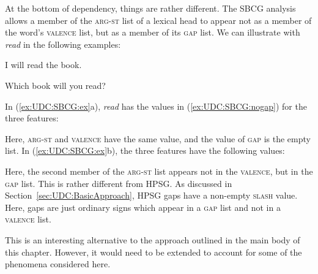 \documentclass[output=paper
,notxmath 
	        ,collection
	        ,collectionchapter
 	        ,biblatex
                ,babelshorthands
                ,newtxmath
                ,draftmode
                ,colorlinks, citecolor=brown
]{langscibook}
\begin{document}
At the bottom of dependency, things are rather different. The SBCG
analysis allows a member of the \textsc{arg-st} list of a lexical head
to appear not as a member of the word’s \textsc{valence} list, but as
a member of its \textsc{gap} list. We can illustrate with
\textit{read} in the following examples:

\begin{exe}
  \ex \label{ex:UDC:SBCG:ex}
  \begin{xlist}
    \ex I will read the book.
    
    \ex Which book will you read?
  \end{xlist}

\end{exe}

\noindent
In (\ref{ex:UDC:SBCG:ex}a), \textit{read} has the values in
(\ref{ex:UDC:SBCG:nogap}) for the three features:

\begin{exe}
  \ex \label{ex:UDC:SBCG:nogap}

\end{exe}

\noindent
Here, \textsc{arg-st} and \textsc{valence} have the same value, and
the value of \textsc{gap} is the empty list. In
(\ref{ex:UDC:SBCG:ex}b), the three features have the following values:

\begin{exe}
  \ex \label{ex:UDC:SBCG:gap}

\end{exe}
	
\noindent
Here, the second member of the \textsc{arg-st} list appears not in the
\textsc{valence}, but in the \textsc{gap} list. This is rather
different from HPSG. As discussed in
Section~\ref{sec:UDC:BasicApproach}, HPSG gaps have a non-empty
\textsc{slash} value. Here, gaps are just ordinary signs which appear
in a \textsc{gap} list and not in a \textsc{valence} list.

This is an interesting alternative to the approach outlined in the
main body of this chapter. However, it would need to be extended to
account for some of the phenomena considered here.











 

{\sloppy
\printbibliography[heading=subbibliography,notkeyword=this]
}
\end{document}
